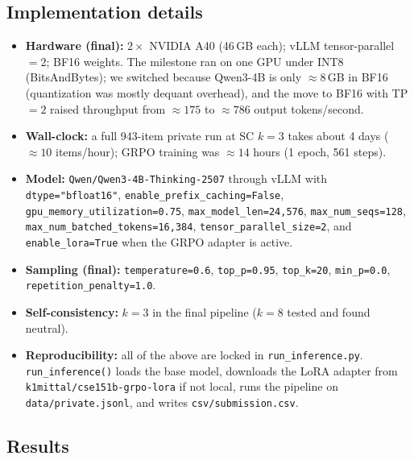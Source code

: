 \documentclass{article}
\begin{document}
\subsection{Implementation details}
\label{sec:implementation_details}
\begin{itemize}
    \item \textbf{Hardware (final):} $2\times$ NVIDIA A40 (46\,GB
    each); vLLM tensor-parallel $=2$; BF16 weights. The milestone
    ran on one GPU under INT8 (BitsAndBytes); we switched because
    Qwen3-4B is only $\approx 8$\,GB in BF16 (quantization was
    mostly dequant overhead), and the move to BF16 with TP$=2$
    raised throughput from $\approx 175$ to $\approx 786$ output
    tokens/second.
    \item \textbf{Wall-clock:} a full 943-item private run at
    SC $k=3$ takes about 4 days ($\approx 10$ items/hour);
    GRPO training was $\approx 14$ hours (1 epoch, 561 steps).
    \item \textbf{Model:} \texttt{Qwen/Qwen3-4B-Thinking-2507}
    through vLLM with \texttt{dtype="bfloat16"},
    \texttt{enable\_prefix\_caching=False},
    \texttt{gpu\_memory\_utilization=0.75},
    \texttt{max\_model\_len=24{,}576},
    \texttt{max\_num\_seqs=128},
    \texttt{max\_num\_batched\_tokens=16{,}384},
    \texttt{tensor\_parallel\_size=2}, and
    \texttt{enable\_lora=True} when the GRPO adapter is active.
    \item \textbf{Sampling (final):} \texttt{temperature=0.6},
    \texttt{top\_p=0.95}, \texttt{top\_k=20}, \texttt{min\_p=0.0},
    \texttt{repetition\_penalty=1.0}.
    \item \textbf{Self-consistency:} $k=3$ in the final pipeline
    ($k=8$ tested and found neutral).
    \item \textbf{Reproducibility:} all of the above are locked in
    \texttt{run\_inference.py}. \texttt{run\_inference()} loads
    the base model, downloads the LoRA adapter from
    \texttt{k1mittal/cse151b-grpo-lora} if not local, runs the
    pipeline on \texttt{data/private.jsonl}, and writes
    \texttt{csv/submission.csv}.
\end{itemize}

\subsection{Results}
\label{sec:results}
\end{document}
